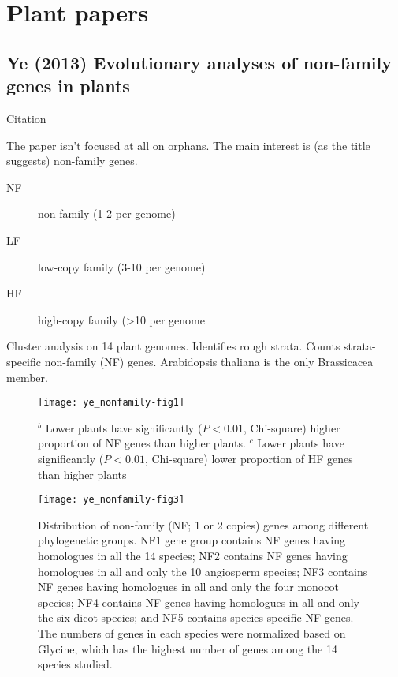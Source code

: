 \section{Plant papers}
\subsection{Ye (2013) Evolutionary analyses of non-family genes in plants}

    Citation \cite{ye_evolutionary_2013}

    The paper isn't focused at all on orphans. The main interest is (as the
    title suggests) non-family genes.

    \begin{description} \item[NF] non-family (1-2 per genome) \item[LF]
            low-copy family (3-10 per genome) \item[HF] high-copy family
                (>10 per genome \end{description}

    Cluster analysis on 14 plant genomes. Identifies rough strata. Counts
    strata-specific non-family (NF) genes. Arabidopsis thaliana is the only
    Brassicacea member.

    \begin{figure}[!hbpt] \centering \texttt{[image: ye\_nonfamily-fig1]}
        \caption{ ${}^b$ Lower plants have significantly ($P < 0.01$,
        Chi-square) higher proportion of NF genes than higher plants.
        ${}^c$ Lower plants have significantly ($P < 0.01$, Chi-square)
        lower proportion of HF genes than higher plants } \end{figure}

    \begin{figure}[!hbpt] \centering \texttt{[image: ye\_nonfamily-fig3]}
        \caption{ Distribution of non-family (NF; 1 or 2 copies) genes
            among different phylogenetic groups. NF1 gene group contains NF
            genes having homologues in all the 14 species; NF2 contains NF
            genes having homologues in all and only the 10 angiosperm
            species; NF3 contains NF genes having homologues in all and
            only the four monocot species; NF4 contains NF genes having
            homologues in all and only the six dicot species; and NF5
            contains species-specific NF genes. The numbers of genes in
        each species were normalized based on Glycine, which has the
    highest number of genes among the 14 species studied.  } \end{figure}

